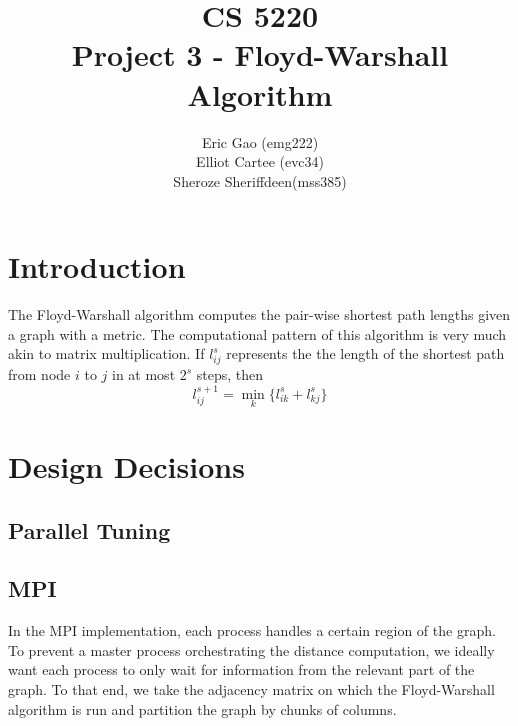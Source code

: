 \documentclass[11pt]{article}
\begin{document}
\title{CS 5220\\ Project 3 - Floyd-Warshall Algorithm}
\author{Eric Gao (emg222)\\ Elliot Cartee (evc34)\\ Sheroze Sheriffdeen(mss385)}
\maketitle

\section{Introduction}
The Floyd-Warshall algorithm computes the pair-wise shortest path lengths given a graph with a metric. The computational pattern of this algorithm is very much akin to matrix multiplication. If $l_{ij}^s$ represents the the length of the shortest path from node $i$ to $j$ in at most $2^s$ steps, \cite{writeup} then
\begin{equation}
	l_{ij}^{s+1} = \min_k \{ l_{ik}^s + l_{kj}^s \}
\end{equation} 

\section{Design Decisions}
 
\subsection{Parallel Tuning}
\subsection{MPI}

In the MPI implementation, each process handles a certain region of the graph. To prevent a master process orchestrating the distance computation, we ideally want each process to only wait for information from the relevant part of the graph. To that end, we take the adjacency matrix on which the Floyd-Warshall algorithm is run and partition the graph by chunks of columns. 
\end{document}
